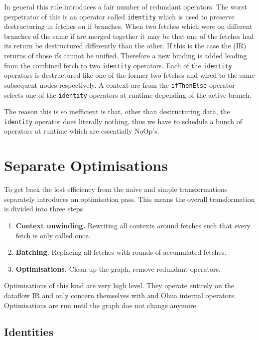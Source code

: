 In general this rule introduces a fair number of redundant operators.
The worst perpetrator of this is an operator called \texttt{identity} which is used to preserve destructuring in fetches on if branches.
When two fetches which were on different branches of the same if are merged together it may be that one of the fetches had its return be destructured differently than the other.
If this is the case the (IR) returns of those ifs cannot be unified.
Therefore a new binding is added leading from the combined fetch to two \texttt{identity} operators.
Each of the \texttt{identity} operators is destructured like one of the former two fetches and wired to the same subsequent nodes respectively.
A context arc from the \texttt{ifThenElse} operator selects one of the \texttt{identity} operators at runtime depending of the active branch.

The reason this is so inefficient is that, other than destructuring data, the \texttt{identity} operator does literally nothing, thus we have to schedule a bunch of operators at runtime which are essentially NoOp's.

\section{Separate Optimisations}

To get back the lost efficiency from the naive and simple transformations \yauhau{} separately introduces an optimisation pass.
This means the overall transformation is divided into three steps

\begin{enumerate}
    \item \textbf{Context unwinding.} Rewriting all contexts around fetches such that every fetch is only called once.
    \item \textbf{Batching.} Replacing all fetches with rounds of accumulated fetches.
    \item \textbf{Optimisations.} Clean up the graph, remove redundant operators.
\end{enumerate}

Optimisations of this kind are very high level.
They operate entirely on the dataflow IR and only concern themselves with \yauhau{} and Ohua internal operators.
Optimisations are run until the graph doe not change anymore.


\subsection{Identities}

